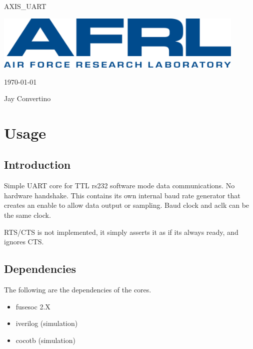 \begin{titlepage}
  \begin{center}

  {\Huge AXIS\_UART}

  \vspace{25mm}

  \includegraphics[width=0.90\textwidth,height=\textheight,keepaspectratio]{img/AFRL.png}

  \vspace{25mm}

  \today

  \vspace{15mm}

  {\Large Jay Convertino}

  \end{center}
\end{titlepage}

\tableofcontents

\newpage

\section{Usage}

\subsection{Introduction}

\par
Simple UART core for TTL rs232 software mode data communications. No hardware handshake.
This contains its own internal baud rate generator that creates an enable to allow data output
or sampling. Baud clock and aclk can be the same clock.

RTS/CTS is not implemented, it simply asserts it as if its always ready, and ignores CTS.

\subsection{Dependencies}

\par
The following are the dependencies of the cores.

\begin{itemize}
  \item fusesoc 2.X
  \item iverilog (simulation)
  \item cocotb (simulation)
\end{itemize}

